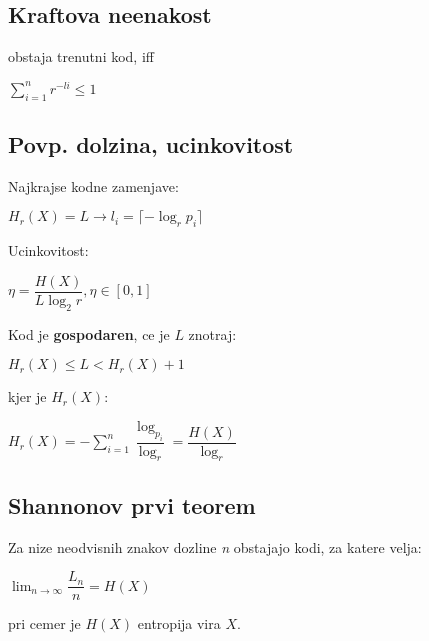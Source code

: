 \documentclass{article}
\begin{document}
\begin{multicols}{4}
\subsection{Kraftova neenakost}
obstaja trenutni kod, iff
\begin{center}
    \begin{math}
        \sum_{i=1}^n r^{-li} \leq 1
    \end{math}
\end{center}

\subsection{Povp. dolzina, ucinkovitost}
Najkrajse kodne zamenjave: 
\begin{center}
    \begin{math}
        H_r(X) = L \rightarrow l_i = \lceil - \log_r p_i \rceil
    \end{math}
\end{center}
Ucinkovitost:
\begin{center}
    \begin{math}
        \eta = \dfrac{H(X)}{L \log_2 r}, \eta \in [0, 1]
    \end{math}
\end{center}
Kod je \textbf{gospodaren}, ce je $L$ znotraj:
\begin{center}
    \begin{math}
        H_r(X) \leq L < H_r(X) + 1
    \end{math}
\end{center}
kjer je $H_r(X)$:
\begin{center}
    \begin{math}
        H_r(X) = -\sum^{n}_{i=1} \dfrac{\log_{p_i}}{\log_r} = \dfrac{H(X)}{\log_r}
    \end{math}
\end{center}

\subsection{Shannonov prvi teorem}
Za nize neodvisnih znakov dozline \textit{n} obstajajo kodi,
za katere velja:
\begin{center}
    \begin{math}
        \lim_{n \rightarrow \infty} \dfrac{L_n}{n} = H(X)
    \end{math}
\end{center}
pri cemer je $H(X)$ entropija vira $X$.


\end{multicols}
\end{document}
